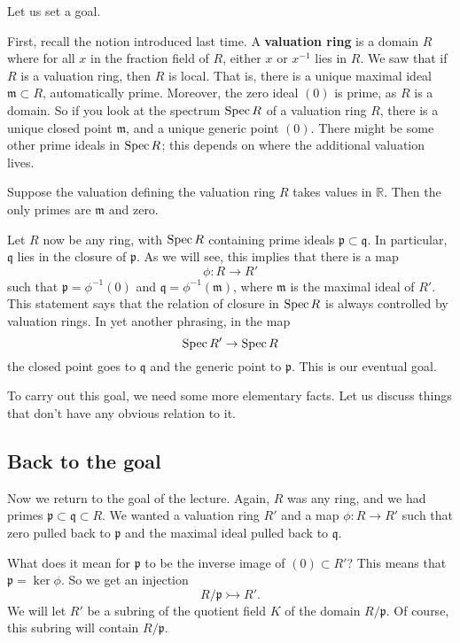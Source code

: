 Let us set a goal.


First, recall the notion introduced last time. A \textbf{valuation ring} is a
domain $R$ where for all $x$ in the fraction field of $R$, either $x$ or
$x^{-1}$ lies in $R$. We saw that if $R$ is a valuation ring, then $R$ is
local. That is, there is a unique maximal ideal $\mathfrak{m} \subset R$,
automatically prime.  Moreover, the zero ideal $(0)$ is prime, as $R$ is a
domain. So if you look at the spectrum $\operatorname{Spec} R$ of a valuation ring $R$, there
is a unique closed point $\mathfrak{m}$, and a unique generic point
$(0)$.  There might be some other prime ideals in $\operatorname{Spec} R$; this depends on
where the additional valuation lives.

\begin{example}
Suppose the valuation defining the valuation ring $R$ takes values in
$\mathbb{R}$. Then the only primes are $\mathfrak{m}$ and zero.
\end{example}

Let $R$ now be any ring, with $\operatorname{Spec} R$ containing prime ideals
$\mathfrak{p} \subset \mathfrak{q}$.  In particular, $\mathfrak{q}$ lies in
the closure of $\mathfrak{p}$.
As we will see, this implies that there is a map
\[  \phi: R \to R'  \]
such that $\mathfrak{p} = \phi^{-1}(0)$ and $\mathfrak{q} =
\phi^{-1}(\mathfrak{m})$, where $\mathfrak{m}$ is the maximal ideal of $R'$.
This statement says that the relation of closure in $\operatorname{Spec} R$ is always
controlled by valuation rings.
In yet another phrasing, in the map
\[ \operatorname{Spec} R' \to \operatorname{Spec} R  \]
the closed point goes to $\mathfrak{q}$ and the generic point to
$\mathfrak{p}$. This is our eventual goal.

To carry out this goal, we need some more elementary facts. Let us discuss
things that don't have any obvious relation to it.

\subsection{Back to the goal} Now we return to the goal of the  lecture. Again,
$R$
was any ring, and we had primes $\mathfrak{p} \subset \mathfrak{q} \subset
R$. We
wanted a valuation ring $R'$ and a map $\phi: R \to R'$ such that zero pulled
back to $\mathfrak{p}$ and the maximal ideal pulled back to $\mathfrak{q}$.

What does it mean for $\mathfrak{p}$ to be the inverse image of $(0) \subset
R'$? This means that $\mathfrak{p} = \ker \phi$. So we get an injection
\[ R/\mathfrak{p} \rightarrowtail R'.  \]
We will let $R'$ be a subring of the quotient field $K$ of the domain
$R/\mathfrak{p}$. Of course, this subring will contain $R/\mathfrak{p}$.

